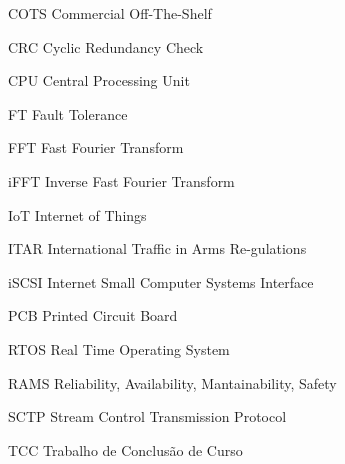 \listoffigures*
\cleardoublepage


\listofquadros*
\cleardoublepage
\listofequacao*
\cleardoublepage

\begin{siglas}
    \item[COTS]  Commercial Off-The-Shelf
    \item[CRC]   Cyclic Redundancy Check
    \item[CPU]   Central Processing Unit
    \item[FT]    Fault Tolerance
    \item[FFT]   Fast Fourier Transform
    \item[iFFT]  Inverse Fast Fourier Transform
    \item[IoT]   Internet of Things
    \item[ITAR]  International Traffic in Arms Re-gulations
	\item[iSCSI] Internet Small Computer Systems Interface
    \item[PCB]   Printed Circuit Board
    \item[RTOS]  Real Time Operating System
    \item[RAMS]  Reliability, Availability, Mantainability, Safety
	\item[SCTP]  Stream Control Transmission Protocol
    \item[TCC]   Trabalho de Conclusão de Curso
\end{siglas}


\tableofcontents*
\cleardoublepage
